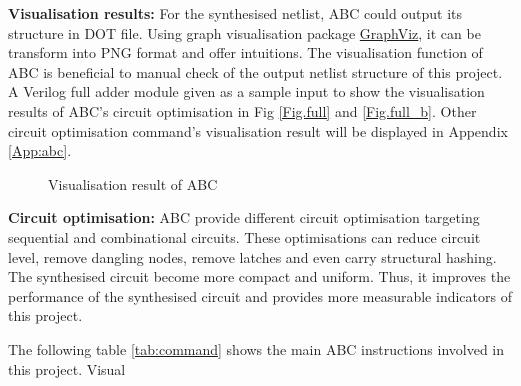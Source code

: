 \textbf{Visualisation results:} For the synthesised netlist, ABC could output its structure in DOT file. Using graph visualisation package \href{https://www.graphviz.org}{GraphViz}, it can be transform into PNG format and offer intuitions. The visualisation function of ABC is beneficial to manual check of the output netlist structure of this project. A Verilog full adder module given as a sample input to show the visualisation results of ABC's circuit optimisation in Fig \ref{Fig.full} and \ref{Fig.full_b}. Other circuit optimisation command's visualisation result will be displayed in Appendix \ref{App:abc}.
\begin{figure}[htb]
\centering
{}
\caption{\footnotesize Visualisation result of ABC}
\end{figure}

\textbf{Circuit optimisation:} ABC provide different circuit optimisation targeting sequential and combinational circuits. These optimisations can reduce circuit level, remove dangling nodes, remove latches and even carry structural hashing. The synthesised circuit become more compact and uniform. Thus, it improves the performance of the synthesised circuit and provides more measurable indicators of this project. 

The following table \ref{tab:command} shows the main ABC instructions involved in this project. Visual

